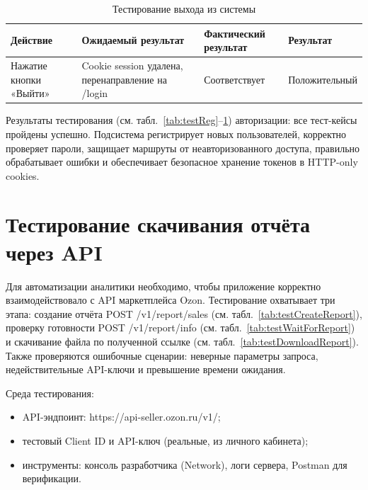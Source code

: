 \begin{table}[H]
\caption{\label{tab:testExit}Тестирование выхода из системы}
\small
\begin{tabular}{|p{4cm}|p{4cm}|p{3cm}|p{4cm}|}
\hline
Действие & Ожидаемый результат & Фактический результат & Результат \\ \hline
Нажатие кнопки «Выйти» & Cookie session удалена, перенаправление на /login & Соответствует & Положительный \\ \hline
\end{tabular}
\end{table}

Результаты тестирования (см. табл.~\ref{tab:testReg}--\ref{tab:testExit}) авторизации: все тест-кейсы пройдены успешно. Подсистема регистрирует новых пользователей, корректно проверяет пароли, защищает маршруты от неавторизованного доступа, правильно обрабатывает ошибки и обеспечивает безопасное хранение токенов в HTTP-only cookies.

\section{Тестирование скачивания отчёта через API}

Для автоматизации аналитики необходимо, чтобы приложение корректно взаимодействовало с API маркетплейса Ozon. Тестирование охватывает три этапа: создание отчёта POST /v1/report/sales (см. табл.~\ref{tab:testCreateReport}), проверку готовности POST /v1/report/info (см. табл.~\ref{tab:testWaitForReport}) и скачивание файла по полученной ссылке (см. табл.~\ref{tab:testDownloadReport}). Также проверяются ошибочные сценарии: неверные параметры запроса, недействительные API-ключи и превышение времени ожидания.

Среда тестирования:
\begin{itemize}
\item API-эндпоинт: https://api-seller.ozon.ru/v1/;
\item тестовый Client ID и API-ключ (реальные, из личного кабинета);
\item инструменты: консоль разработчика (Network), логи сервера, Postman для верификации.
\end{itemize}

